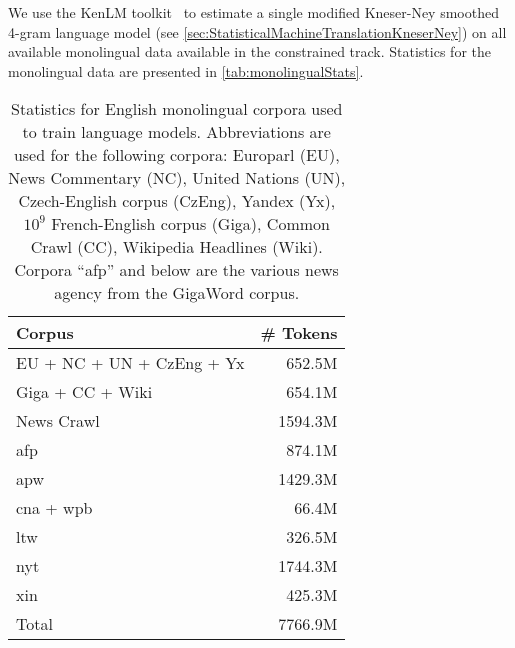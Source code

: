 We use the KenLM toolkit~\citep{heafield-pouzyrevsky-clark-koehn:2013:ACL} to estimate
a single modified Kneser-Ney smoothed 4-gram language
model (see \autoref{sec:StatisticalMachineTranslationKneserNey})
on all available monolingual data available in the constrained track.
Statistics for the monolingual data are presented in \autoref{tab:monolingualStats}.
%
\begin{table}[htbp]
\begin{center}
\begin{tabular}{l|r}
Corpus & \# Tokens \\
\hline
EU + NC + UN + CzEng + Yx & 652.5M \\
Giga + CC + Wiki & 654.1M \\
News Crawl & 1594.3M \\
afp & 874.1M \\
apw & 1429.3M \\
cna + wpb & 66.4M \\
ltw & 326.5M \\
nyt & 1744.3M \\
xin & 425.3M \\
\hline
Total & 7766.9M \\
\end{tabular}
\end{center}
\caption{Statistics for English monolingual corpora used to train language models.
  Abbreviations are used for the following corpora: Europarl (EU), News Commentary (NC), United Nations (UN), Czech-English corpus (CzEng), Yandex (Yx),
  $10^9$ French-English corpus (Giga), Common Crawl (CC), Wikipedia Headlines (Wiki). Corpora ``afp'' and below are the various news agency from the
  GigaWord corpus.} %
\label{tab:monolingualStats}
\end{table}

